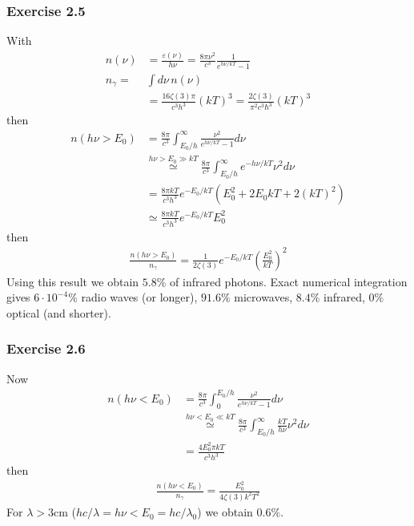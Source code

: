 \documentclass[10pt,a4paper]{book}
\theoremstyle{definition}
\begin{document}
\subsubsection{Exercise 2.5}
With
\begin{align}
n(\nu)&=\frac{\varepsilon(\nu)}{h\nu}=\frac{8\pi\nu^2}{c^3}\frac{1}{e^{h\nu/kT}-1}\\
n_\gamma=&\int d\nu\,n(\nu)\\
&=\frac{16\zeta(3)\pi}{c^3h^3}(kT)^3
=\frac{2\zeta(3)}{\pi^2c^3\hbar^3}(kT)^3
\end{align}
then
\begin{align}
n(h\nu>E_0)&=\frac{8\pi}{c^3}\int_{E_0/h}^\infty\frac{\nu^2}{e^{h\nu/kT}-1}d\nu\\
&\overset{h\nu>E_0\gg kT}{\simeq}\frac{8\pi}{c^3}\int_{E_0/h}^\infty e^{-h\nu/kT}\nu^2 d\nu\\
&=\frac{8\pi kT}{c^3h^3}e^{-E_0/kT}(E_0^2+2E_0kT+2(kT)^2)\\
&\simeq\frac{8\pi kT}{c^3h^3}e^{-E_0/kT}E_0^2
\end{align}
then
\begin{align}
\frac{n(h\nu>E_0)}{n_\gamma}=\frac{1}{2\zeta(3)}e^{-E_0/kT}\left(\frac{E_0^2}{kT}\right)^2
\end{align}
Using this result we obtain $5.8\%$ of infrared photons. Exact numerical integration gives $6\cdot10^{-4}\%$ radio waves (or longer), $91.6\%$ microwaves, $8.4\%$ infrared, $0\%$ optical (and shorter).

\subsubsection{Exercise 2.6}
Now
\begin{align}
n(h\nu<E_0)&=\frac{8\pi}{c^3}\int_0^{E_0/h}\frac{\nu^2}{e^{h\nu/kT}-1}d\nu\\
&\overset{h\nu<E_0\ll kT}{\simeq}\frac{8\pi}{c^3}\int_{E_0/h}^\infty \frac{kT}{h\nu}\nu^2d\nu\\
&=\frac{4E_0^2 \pi kT}{c^3h^3}
\end{align}
then
\begin{align}
\frac{n(h\nu<E_0)}{n_\gamma}=\frac{E_0^2}{4\zeta(3)k^2T^2}
\end{align}
For $\lambda>3$cm ($hc/\lambda=h\nu<E_0=hc/\lambda_0$) we obtain $0.6\%$.
\end{document}

